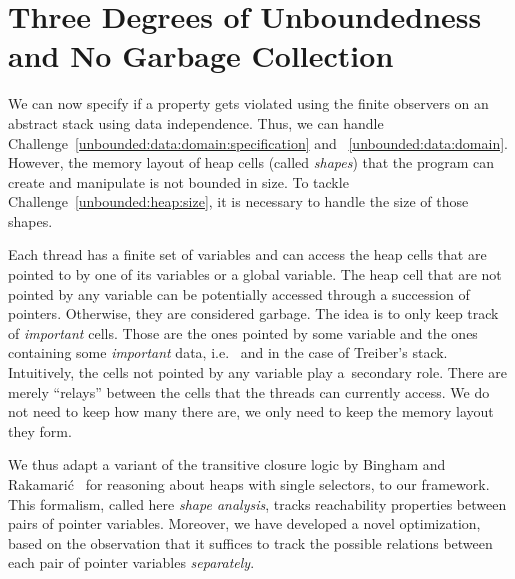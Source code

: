 \section[Bounded Abstract Domain | No Garbage Collection]%
{Three Degrees of Unboundedness {\footnotesize and No Garbage Collection}}
\label{section:unboundedness}
\label{section:nogc}

We can now specify if a property gets violated using the finite
observers on an abstract stack using data independence.
%
Thus, we can handle
Challenge~\ref{unbounded:data:domain:specification} and
~\ref{unbounded:data:domain}.
%
However, the memory layout of heap cells (called \emph{shapes}) that
the program can create and manipulate is not bounded in size.
%
To tackle Challenge~\ref{unbounded:heap:size}, it is necessary to
handle the size of those shapes.

Each thread has a finite set of variables and can access the heap
cells that are pointed to by one of its variables or a global
variable. The heap cell that are not pointed by any variable can be
potentially accessed through a succession of 
pointers. Otherwise, they are considered garbage.
%
The idea is to only keep track of \emph{important} cells. Those are
the ones pointed by some variable and the ones containing some
\emph{important} data, i.e.\  and  in the
case of Treiber's stack.
%
Intuitively, the cells not pointed by any variable play a~secondary
role. There are merely ``relays'' between the cells that the threads
can currently access. We do not need to keep how many there are, we
only need to keep the memory layout they form.

%
We thus adapt a variant of the transitive closure logic by Bingham and
Rakamari\'c~\cite{BiRa:vmcai06} for reasoning about heaps with single
selectors, to our framework. This formalism, called here \emph{shape
  analysis}, %
%
tracks reachability properties %
between pairs of pointer variables.
%
Moreover, we have developed a novel optimization, based on the
observation that it suffices to track the possible relations between
each pair of pointer variables \emph{separately}.

